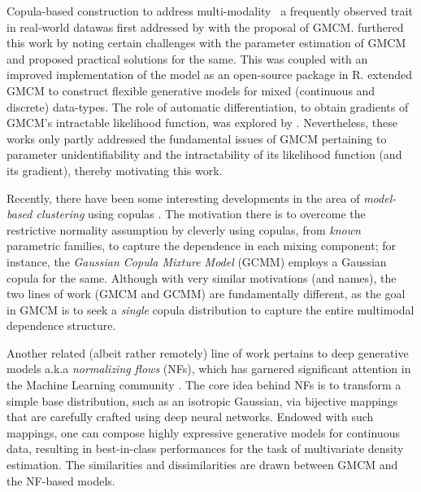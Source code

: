 \documentclass{article}
\theoremstyle{plain}
\theoremstyle{definition}
\theoremstyle{remark}
\begin{document}
Copula-based construction to address multi-modality \textemdash \ a frequently observed trait in real-world data\textemdash was first addressed by \citet{Tewari2011} with the proposal of GMCM. \citet{Bilgrau2016} furthered this work by noting certain challenges with the parameter estimation of GMCM and proposed practical solutions for the same. This was coupled with an improved implementation of the model as an open-source package \citep{Bilgrau_Rpackage} in R. \citet{Rajan2016_GMCM_mixed_data} extended GMCM to construct flexible generative models for mixed (continuous and discrete) data-types. The role of automatic differentiation, to obtain gradients of GMCM's intractable likelihood function, was explored by \citet{Kasa2022}. Nevertheless, these works only partly addressed the fundamental issues of GMCM pertaining to parameter unidentifiability and the intractability of its likelihood function (and its gradient), thereby motivating this work.

Recently, there have been some interesting developments in the area of \emph{model-based clustering} using copulas \citep{Kosmidis2016,Mazo2017,Marbac2017,Rey2012_CopulaMixture}. The motivation there is to overcome the restrictive normality assumption by cleverly using copulas, from \emph{known} parametric families, to capture the dependence in each mixing component; for instance, the \emph{Gaussian Copula Mixture Model} (GCMM) \citep{Marbac2017} employs a Gaussian copula for the same. Although with very similar motivations (and names), the two lines of work (GMCM and GCMM) are fundamentally different, as the goal in GMCM is to seek a \emph{single} copula distribution to capture the entire multimodal dependence structure. 

Another related (albeit rather remotely) line of work pertains to deep generative models a.k.a \emph{normalizing flows} (NFs), which has garnered significant attention in the Machine Learning community \citep[see][for a comprehensive review on NFs]{Kobyzev2021}. The core idea behind NFs is to transform a simple base distribution, such as an isotropic Gaussian, via bijective mappings that are carefully crafted using deep neural networks. Endowed with such mappings, one can compose highly expressive generative models for continuous data, resulting in best-in-class performances for the task of multivariate density estimation. The similarities and dissimilarities are drawn between GMCM and the NF-based models.   
\end{document}
